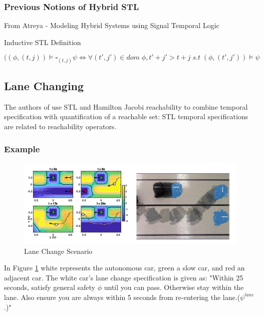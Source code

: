 \documentclass{article}
\theoremstyle{definition}
\begin{document}

\subsubsection{Previous Notions of Hybrid STL}
From Atreya - Modeling Hybrid Systems using Signal Temporal Logic
\begin{center}
    Inductive STL Definition
\end{center}

\begin{equation}
            ((\phi,(t,j)) \models \square_{(t,j)} \psi \Leftrightarrow \forall (t',j') \in dom\;\phi, t'+j' > t + j\;s.t\;(\phi, (t',j')) \models \psi
\end{equation}




\clearpage
\appendix
\subsection{Lane Changing}
The authors of \cite{chen_signal_nodate} use STL and Hamilton Jacobi reachability to combine temporal specification with quantification of a reachable set: STL temporal specifications are related to reachability operators.

\subsubsection{Example}
\begin{figure}[H] 
\centering
\includegraphics[width=4.5in]{Figures/chen_lanechange.png}
\caption{Lane Change Scenario}
\label{fig:chen_lane_change}
\end{figure}
In Figure \ref{fig:chen_lane_change} white represents the autonomous car, green a slow car, and red an adjacent car. The white car's lane change specification is given as: "Within 25 seconds, satisfy general safety $\phi$ until you can pass. Otherwise stay within the lane. Also ensure you are always within 5 seconds from re-entering the lane.($\psi^{lane}$.)"
\end{document}
